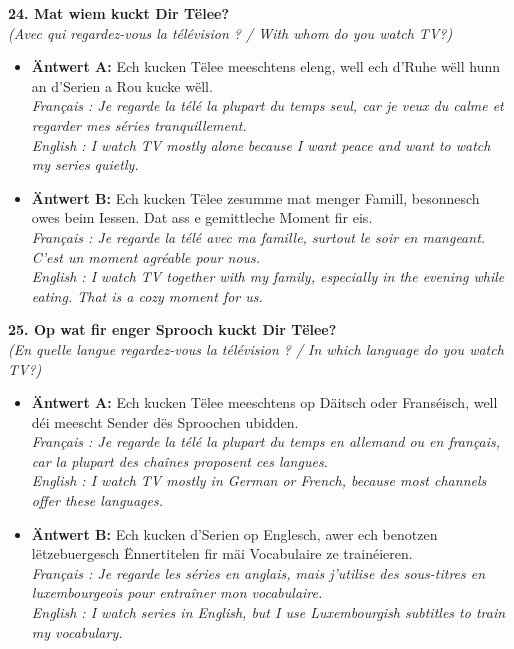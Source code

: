 \noindent\textbf{24. Mat wiem kuckt Dir Tëlee?}\\
\textit{(Avec qui regardez-vous la télévision ? / With whom do you watch TV?)}
\begin{itemize}
    \item \textbf{Äntwert A:} Ech kucken Tëlee meeschtens eleng, well ech d'Ruhe wëll hunn an d'Serien a Rou kucke wëll.\\
    \textit{Français : Je regarde la télé la plupart du temps seul, car je veux du calme et regarder mes séries tranquillement.}\\
    \textit{English : I watch TV mostly alone because I want peace and want to watch my series quietly.}
    \item \textbf{Äntwert B:} Ech kucken Tëlee zesumme mat menger Famill, besonnesch owes beim Iessen. Dat ass e gemittleche Moment fir eis.\\
    \textit{Français : Je regarde la télé avec ma famille, surtout le soir en mangeant. C'est un moment agréable pour nous.}\\
    \textit{English : I watch TV together with my family, especially in the evening while eating. That is a cozy moment for us.}
\end{itemize}
\vspace{0.5em}

\noindent\textbf{25. Op wat fir enger Sprooch kuckt Dir Tëlee?}\\
\textit{(En quelle langue regardez-vous la télévision ? / In which language do you watch TV?)}
\begin{itemize}
    \item \textbf{Äntwert A:} Ech kucken Tëlee meeschtens op Däitsch oder Franséisch, well déi meescht Sender dës Sproochen ubidden.\\
    \textit{Français : Je regarde la télé la plupart du temps en allemand ou en français, car la plupart des chaînes proposent ces langues.}\\
    \textit{English : I watch TV mostly in German or French, because most channels offer these languages.}
    \item \textbf{Äntwert B:} Ech kucken d'Serien op Englesch, awer ech benotzen lëtzebuergesch Ënnertitelen fir mäi Vocabulaire ze trainéieren.\\
    \textit{Français : Je regarde les séries en anglais, mais j'utilise des sous-titres en luxembourgeois pour entraîner mon vocabulaire.}\\
    \textit{English : I watch series in English, but I use Luxembourgish subtitles to train my vocabulary.}
\end{itemize}
\vspace{0.5em}

